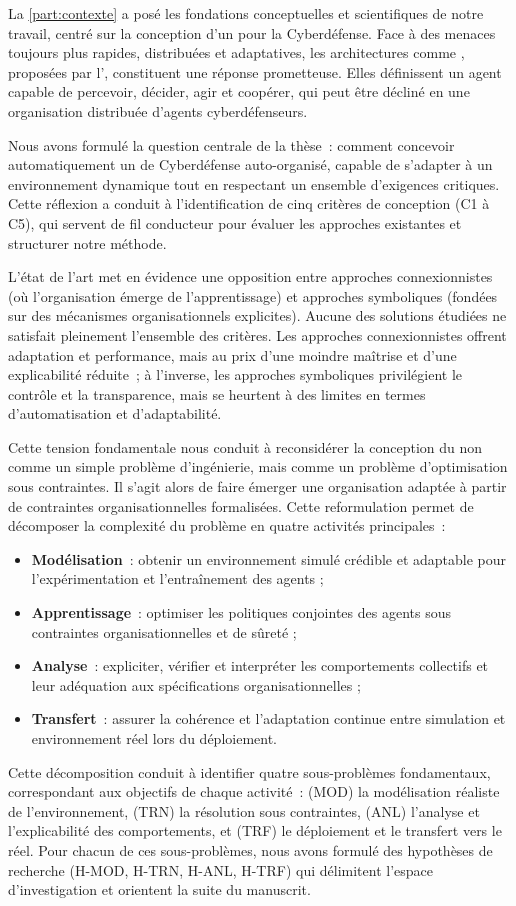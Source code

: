 La \autoref{part:contexte} a posé les fondations conceptuelles et scientifiques de notre travail, centré sur la conception d’un  pour la Cyberdéfense. Face à des menaces toujours plus rapides, distribuées et adaptatives, les architectures comme , proposées par l’, constituent une réponse prometteuse. Elles définissent un agent capable de percevoir, décider, agir et coopérer, qui peut être décliné en une organisation distribuée d’agents cyberdéfenseurs.

Nous avons formulé la question centrale de la thèse~: comment concevoir automatiquement un  de Cyberdéfense auto-organisé, capable de s’adapter à un environnement dynamique tout en respectant un ensemble d’exigences critiques. Cette réflexion a conduit à l’identification de cinq critères de conception (C1 à C5), qui servent de fil conducteur pour évaluer les approches existantes et structurer notre méthode.

L’état de l’art met en évidence une opposition entre approches connexionnistes (où l’organisation émerge de l’apprentissage) et approches symboliques (fondées sur des mécanismes organisationnels explicites). Aucune des solutions étudiées ne satisfait pleinement l’ensemble des critères. Les approches connexionnistes offrent adaptation et performance, mais au prix d’une moindre maîtrise et d’une explicabilité réduite~; à l’inverse, les approches symboliques privilégient le contrôle et la transparence, mais se heurtent à des limites en termes d’automatisation et d’adaptabilité.

Cette tension fondamentale nous conduit à reconsidérer la conception du  non comme un simple problème d’ingénierie, mais comme un problème d’optimisation sous contraintes. Il s’agit alors de faire émerger une organisation adaptée à partir de contraintes organisationnelles formalisées. Cette reformulation permet de décomposer la complexité du problème en quatre activités principales~:
\begin{itemize}
  \item \textbf{Modélisation}~: obtenir un environnement simulé crédible et adaptable pour l’expérimentation et l’entraînement des agents ;
  \item \textbf{Apprentissage}~: optimiser les politiques conjointes des agents sous contraintes organisationnelles et de sûreté ;
  \item \textbf{Analyse}~: expliciter, vérifier et interpréter les comportements collectifs et leur adéquation aux spécifications organisationnelles ;
  \item \textbf{Transfert}~: assurer la cohérence et l’adaptation continue entre simulation et environnement réel lors du déploiement.
\end{itemize}
Cette décomposition conduit à identifier quatre sous-problèmes fondamentaux, correspondant aux objectifs de chaque activité~: (MOD) la modélisation réaliste de l’environnement, (TRN) la résolution sous contraintes, (ANL) l’analyse et l’explicabilité des comportements, et (TRF) le déploiement et le transfert vers le réel. Pour chacun de ces sous-problèmes, nous avons formulé des hypothèses de recherche (H-MOD, H-TRN, H-ANL, H-TRF) qui délimitent l’espace d’investigation et orientent la suite du manuscrit.


